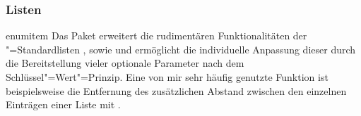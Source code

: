 \subsubsection{Listen}
\begin{packages}
%
\item[enumitem]
  Das Paket  erweitert die rudimentären Funktionalitäten der 
  "=Standardlisten , 
  sowie  und ermöglicht die individuelle Anpassung 
  dieser durch die Bereitstellung vieler optionale Parameter nach dem
  Schlüssel"=Wert"=Prinzip. Eine von mir sehr häufig genutzte Funktion ist 
  beispielsweise die Entfernung des zusätzlichen Abstand zwischen den einzelnen 
  Einträgen einer Liste mit .
%
\end{packages}

